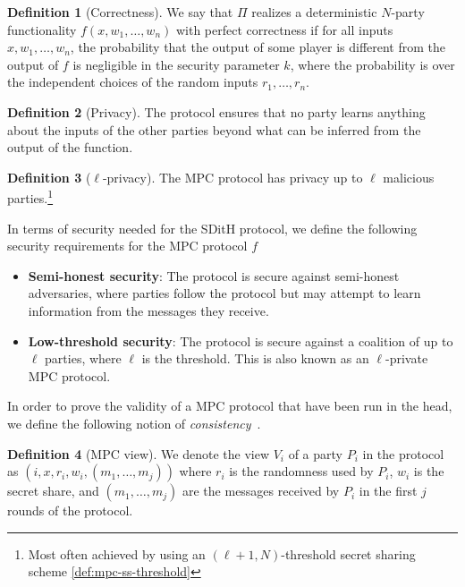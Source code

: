 \documentclass[11pt]{report}
\theoremstyle{definition}
\newtheorem{definition}{Definition}[section]
\theoremstyle{plain}
\begin{document}
\begin{definition}[Correctness]\label{def:mpc-correctness}
  We say that $\Pi$ realizes a deterministic $N$-party functionality $f(x, w_1, \dots, w_n)$ with perfect correctness if for all inputs $x, w_1, \dots, w_n$, the probability that the output of some player is different from the output of $f$ is negligible in the security parameter $k$, where the probability is over the independent choices of the random inputs $r_1, \dots, r_n$.
\end{definition}

\begin{definition}[Privacy]\label{def:mpc-privacy}
  The protocol ensures that no party learns anything about the inputs of the other parties beyond what can be inferred from the output of the function.
\end{definition}

\begin{definition}[$\ell$-privacy]\label{def:mpc-ell-privacy}
  The MPC protocol has privacy up to $\ell$ malicious parties.\footnote{Most often achieved by using an $(\ell + 1, N)$-threshold secret sharing scheme \autoref{def:mpc-ss-threshold}}
\end{definition}

In terms of security needed for the SDitH protocol, we define the following security requirements for the MPC protocol $f$

\begin{itemize}
  \item \textbf{Semi-honest security}: The protocol is secure against semi-honest adversaries, where parties follow the protocol but may attempt to learn information from the messages they receive.
  \item \textbf{Low-threshold security}: The protocol is secure against a coalition of up to $\ell$ parties, where $\ell$ is the threshold. This is also known as an $\ell$-private MPC protocol.
\end{itemize}

In order to prove the validity of a MPC protocol that have been run in the head, we define the following notion of \textit{consistency}~\cite{ishai2007zero}.

\begin{definition}[MPC view]\label{def:mpc-view}
  We denote the view $V_i$ of a party $P_i$ in the protocol as $(i, x, r_i, w_i, (m_1, \dots, m_j))$ where $r_i$ is the randomness used by $P_i$, $w_i$ is the secret share, and $(m_1, \dots, m_j)$ are the messages received by $P_i$ in the first $j$ rounds of the protocol.
\end{definition}
\end{document}
